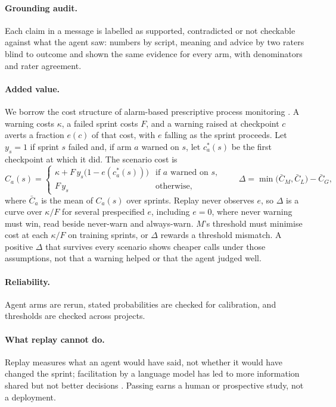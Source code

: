 \documentclass[pmlr]{jmlr}
\begin{document}
\paragraph{Grounding audit.} Each claim in a message is labelled as supported, contradicted or not checkable against what the agent saw: numbers by script, meaning and advice by two raters blind to outcome and shown the same evidence for every arm, with denominators and rater agreement.

\paragraph{Added value.} We borrow the cost structure of alarm-based prescriptive process monitoring \citep{alarm}. A warning costs $\kappa$, a failed sprint costs $F$, and a warning raised at checkpoint $c$ averts a fraction $e(c)$ of that cost, with $e$ falling as the sprint proceeds. Let $y_s = 1$ if sprint $s$ failed and, if arm $a$ warned on $s$, let $c^{*}_a(s)$ be the first checkpoint at which it did. The scenario cost is
\[
C_a(s) = \begin{cases} \kappa + F\, y_s \big(1 - e(c^{*}_a(s))\big) & \text{if } a \text{ warned on } s,\\ F\, y_s & \text{otherwise,} \end{cases}
\qquad
\Delta = \min\big(\bar{C}_M, \bar{C}_L\big) - \bar{C}_G ,
\]
where $\bar{C}_a$ is the mean of $C_a(s)$ over sprints. Replay never observes $e$, so $\Delta$ is a curve over $\kappa/F$ for several prespecified $e$, including $e = 0$, where never warning must win, read beside never-warn and always-warn. $M$'s threshold must minimise cost at each $\kappa/F$ on training sprints, or $\Delta$ rewards a threshold mismatch. A positive $\Delta$ that survives every scenario shows cheaper calls under those assumptions, not that a warning helped or that the agent judged well.

\paragraph{Reliability.} Agent arms are rerun, stated probabilities are checked for calibration, and thresholds are checked across projects.

\paragraph{What replay cannot do.} Replay measures what an agent would have said, not whether it would have changed the sprint; facilitation by a language model has led to more information shared but not better decisions \citep{alsobay}. Passing earns a human or prospective study, not a deployment.
\end{document}
